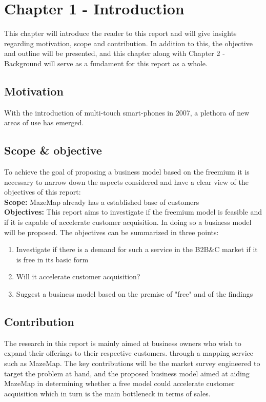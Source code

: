 \chapter{Chapter 1 - Introduction}
This chapter will introduce the reader to this report and will give insights regarding motivation, scope and contribution. In addition to this, the objective and outline will be presented, and this chapter along with Chapter 2 - Background will serve as a fundament for this report as a whole.
\section {Motivation}
With the introduction of multi-touch smart-phones in 2007, a plethora of new areas of use has emerged. 
\section {Scope \& objective}
To achieve the goal of proposing a business model based on the freemium it is necessary to narrow down the aspects considered and have a clear view of the objectives of this report:
\newline
\\
\textbf{Scope: }MazeMap already has a established base of customers
\newline
\\
\textbf{Objectives: }This report aims to investigate if the freemium model is feasible and if it is capable of accelerate customer acquisition. In doing so a business model will be proposed. The objectives can be summarized in three points:
\begin{enumerate}
\item Investigate if there is a demand for such a service in the B2B\&C market if it is free in its basic form
\item Will it accelerate customer acquisition?
\item Suggest a business model based on the premise of "free" and of the findings
\end{enumerate}
\section {Contribution}
The research in this report is mainly aimed at business owners who wish to expand their offerings to their respective customers. through a mapping service such as MazeMap. The key contributions will be the market survey engineered to target the problem at hand, and the proposed business model aimed at aiding MazeMap in determining whether a free model could accelerate customer acquisition which in turn is the main bottleneck in terms of sales.
